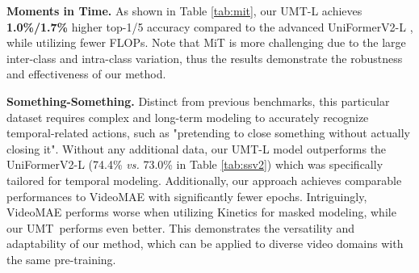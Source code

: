 \documentclass[10pt,twocolumn,letterpaper]{article}
\def\Modelnamelight{UMT}
\begin{document}
\textbf{Moments in Time.}
As shown in Table \ref{tab:mit},
our \Modelnamelight-L achieves \textbf{1.0\%/1.7\%} higher top-1/5 accuracy compared to the advanced UniFormerV2-L \cite{uniformerv2}, 
while utilizing fewer FLOPs.
Note that MiT is more challenging due to the large inter-class and intra-class variation, 
thus the results demonstrate the robustness and effectiveness of our method.

\textbf{Something-Something.}
Distinct from previous benchmarks,
this particular dataset requires complex and long-term modeling to accurately recognize temporal-related actions, 
such as "pretending to close something without actually closing it". 
Without any additional data, 
our \Modelnamelight-L model outperforms the UniFormerV2-L \cite{uniformerv2} (74.4\% \textit{vs.} 73.0\% in Table \ref{tab:ssv2}) which was specifically tailored for temporal modeling. 
Additionally, 
our approach achieves comparable performances to VideoMAE \cite{videomae} with significantly fewer epochs. 
Intriguingly, 
VideoMAE performs worse when utilizing Kinetics for masked modeling, 
while our \Modelnamelight\  performs even better. 
This demonstrates the versatility and adaptability of our method, 
which can be applied to diverse video domains with the same pre-training.
\end{document}
